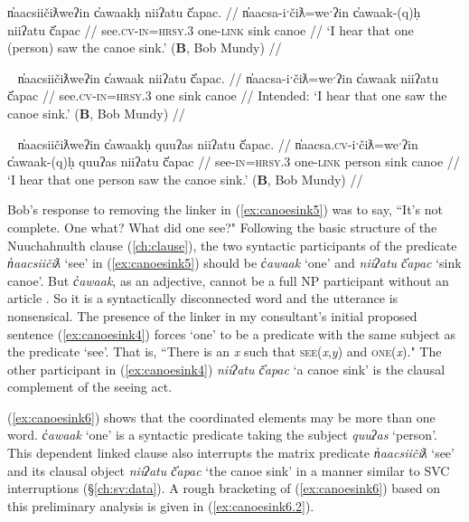 \ex \label{ex:canoesink4}
\begingl
\glpreamble n̓aacsiičiƛweʔin c̓awaakḥ niiʔatu č̓apac. //
\gla n̓aacsa-iˑčiƛ=weˑʔin c̓awaak-(q)ḥ niiʔatu č̓apac //
\glb see.\textsc{cv}-\textsc{in}=\textsc{hrsy.3} one-\textsc{link} sink canoe //
\glft `I hear that one (person) saw the canoe sink.' (\textbf{B}, Bob Mundy) //
\endgl
\xe

\ex~ \label{ex:canoesink5}
\begingl
\glpreamble *n̓aacsiičiƛweʔin c̓awaak niiʔatu č̓apac. //
\gla n̓aacsa-iˑčiƛ=weˑʔin c̓awaak niiʔatu č̓apac //
\glb see.\textsc{cv}-\textsc{in}=\textsc{hrsy.3} one sink canoe //
\glft Intended: `I hear that one saw the canoe sink.' (\textbf{B}, Bob Mundy) //
\endgl
\xe

\ex~ \label{ex:canoesink6}
\begingl
\glpreamble n̓aacsiičiƛweʔin c̓awaakḥ quuʔas niiʔatu č̓apac. //
\gla n̓aacsa.\textsc{cv}-iˑčiƛ=weˑʔin c̓awaak-(q)ḥ quuʔas niiʔatu č̓apac //
\glb see-\textsc{in}=\textsc{hrsy.3} one-\textsc{link} person sink canoe //
\glft `I hear that one person saw the canoe sink.' (\textbf{B}, Bob Mundy) //
\endgl
\xe

Bob's response to removing the linker in (\ref{ex:canoesink5}) was to say, ``It's not complete. One what? What did one see?" Following the basic structure of the Nuuchahnulth clause (\cref{ch:clause}), the two syntactic participants of the predicate \textit{n̓aacsiičiƛ} `see' in (\ref{ex:canoesink5}) should be \textit{c̓awaak} `one' and \textit{niiʔatu č̓apac} `sink canoe'. But \textit{c̓awaak}, as an adjective, cannot be a full NP participant without an article \citep{jacobsen1979}. So it is a syntactically disconnected word and the utterance is nonsensical. The presence of the linker in my consultant's initial proposed sentence (\ref{ex:canoesink4}) forces `one' to be a predicate with the same subject as the predicate `see'. That is, ``There is an \textit{x} such that \textsc{see}(\textit{x},\textit{y}) and \textsc{one}(\textit{x})." The other participant in (\ref{ex:canoesink4}) \textit{niiʔatu č̓apac} `a canoe sink' is the clausal complement of the seeing act.

(\ref{ex:canoesink6}) shows that the coordinated elements may be more than one word. \textit{c̓awaak} `one' is a syntactic predicate taking the subject \textit{quuʔas} `person'.  This dependent linked clause also interrupts the matrix predicate \textit{n̓aacsiičiƛ} `see' and its clausal object \textit{niiʔatu č̓apac} `the canoe sink' in a manner similar to SVC interruptions (\S\ref{ch:sv:data}). A rough bracketing of (\ref{ex:canoesink6}) based on this preliminary analysis is given in (\ref{ex:canoesink6.2}).

